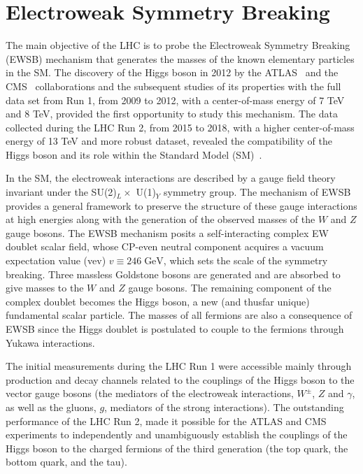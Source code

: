 \section{Electroweak Symmetry Breaking}
The main objective of the LHC is to probe the Electroweak Symmetry Breaking (EWSB) mechanism that generates the masses of the known elementary particles in the SM. The discovery of the Higgs boson in 2012 by the ATLAS~\cite{ATLAS:2012yve} and the CMS~\cite{CMS:2012qbp} collaborations and the subsequent studies of its properties with the full data set from Run 1, from 2009 to 2012, with a center-of-mass energy of 7 TeV and 8 TeV, provided the first opportunity to study this mechanism. The data collected during the LHC Run 2, from 2015 to 2018, with a higher center-of-mass energy of 13 TeV and more robust dataset, revealed the compatibility of the Higgs boson and its role within the Standard Model (SM)~\cite{Glashow:1961tr,PhysRevLett.19.1264,PhysRevD.2.1285}.

In the SM, the electroweak interactions are described by a gauge field theory invariant under the SU(2)$_L\times$ U(1)$_Y$ symmetry group. The mechanism of EWSB~\cite{PhysRevLett.13.321,PhysRev.145.1156} provides a general framework to preserve the structure of these gauge interactions at high energies along with the generation of the observed masses of the $W$ and $Z$ gauge bosons. The EWSB mechanism posits a self-interacting complex EW doublet scalar field, whose CP-even neutral component acquires a vacuum expectation value (vev) $v \equiv 246 \;\text{GeV}$, which sets the scale of the symmetry breaking. Three massless Goldstone bosons are generated and are absorbed to give masses to the $W$ and $Z$ gauge bosons. The remaining component of the complex doublet becomes the Higgs boson, a new (and thusfar unique) fundamental scalar particle. The masses of all fermions are also a consequence of EWSB since the Higgs doublet is postulated to couple to the fermions through Yukawa interactions.

The initial measurements during the LHC Run 1 were accessible mainly through production and decay channels related to the couplings of the Higgs boson to the vector gauge bosons (the mediators of the electroweak interactions, $W^\pm$, $Z$ and $\gamma$, as well as the gluons, $g$, mediators of the strong interactions). The outstanding performance of the LHC Run 2, made it possible for the ATLAS and CMS experiments to independently and unambiguously establish the couplings of the Higgs boson to the charged fermions of the third generation (the top quark, the bottom quark, and the tau).

